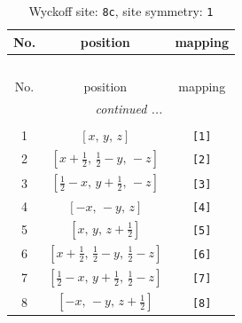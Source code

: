 \documentclass[fleqn,8pt]{jsarticle}
\begin{document}
\renewcommand{\arraystretch}{1.2}
\begin{longtable}{ccc}
\caption{Wyckoff site: {\tt 8c}, site symmetry: {\tt 1}}
 \\
 \hline \hline
No. & position & mapping \\ \hline \endfirsthead

\multicolumn{2}{l}{\tablename\ \thetable{}} \\
 \hline \hline
No. & position & mapping \\ \hline \endhead

 \hline \hline
\multicolumn{2}{r}{\footnotesize\it continued ...} \\ \endfoot

 \hline \hline
\multicolumn{2}{r}{} \\ \endlastfoot

1 & $\left[ x,\, y,\, z \right]$ & {\tt [1]} \\ \hline
2 & $\left[ x + \frac{1}{2},\, \frac{1}{2} - y,\, - z \right]$ & {\tt [2]} \\ \hline
3 & $\left[ \frac{1}{2} - x,\, y + \frac{1}{2},\, - z \right]$ & {\tt [3]} \\ \hline
4 & $\left[ - x,\, - y,\, z \right]$ & {\tt [4]} \\ \hline
5 & $\left[ x,\, y,\, z + \frac{1}{2} \right]$ & {\tt [5]} \\ \hline
6 & $\left[ x + \frac{1}{2},\, \frac{1}{2} - y,\, \frac{1}{2} - z \right]$ & {\tt [6]} \\ \hline
7 & $\left[ \frac{1}{2} - x,\, y + \frac{1}{2},\, \frac{1}{2} - z \right]$ & {\tt [7]} \\ \hline
8 & $\left[ - x,\, - y,\, z + \frac{1}{2} \right]$ & {\tt [8]} \\
\end{longtable}
\end{document}
